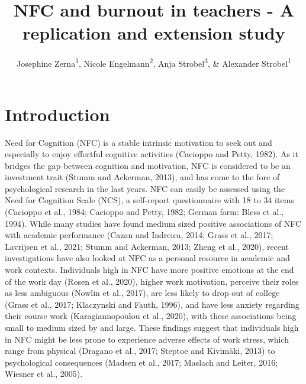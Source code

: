 \documentclass[
  english,
  man,floatsintext]{apa6}
\title{NFC and burnout in teachers - A replication and extension study}
\author{Josephine Zerna\textsuperscript{1}, Nicole Engelmann\textsuperscript{2}, Anja Strobel\textsuperscript{3}, \& Alexander Strobel\textsuperscript{1}}
\date{}
\affiliation{\vspace{0.5cm}\textsuperscript{1} Faculty of Psychology, Technische Universität Dresden\\\textsuperscript{2} Faculty of Education, Technische Universität Dresden\\\textsuperscript{3} Institute of Psychology, Chemnitz University of Technology}
\begin{document}
\maketitle

\renewcommand\thesection{\Alph{section}}
\setcounter{figure}{0}
\setcounter{table}{0}

\hypertarget{introduction}{%
\section{Introduction}\label{introduction}}

Need for Cognition (NFC) is a stable intrinsic motivation to seek out and especially to enjoy effortful cognitive activities (Cacioppo and Petty, 1982).
As it bridges the gap between cognition and motivation, NFC is considered to be an investment trait (Stumm and Ackerman, 2013), and has come to the fore of psychological research in the last years.
NFC can easily be assessed using the Need for Cognition Scale (NCS), a self-report questionnaire with 18 to 34 items (Cacioppo et al., 1984; Cacioppo and Petty, 1982; German form: Bless et al., 1994).
While many studies have found medium sized positive associations of NFC with academic performance (Cazan and Indreica, 2014; Grass et al., 2017; Lavrijsen et al., 2021; Stumm and Ackerman, 2013; Zheng et al., 2020), recent investigations have also looked at NFC as a personal resource in academic and work contexts.
Individuals high in NFC have more positive emotions at the end of the work day (Rosen et al., 2020), higher work motivation, perceive their roles as less ambiguous (Nowlin et al., 2017), are less likely to drop out of college (Grass et al., 2017; Klaczynski and Fauth, 1996), and have less anxiety regarding their course work (Karagiannopoulou et al., 2020), with these associations being small to medium sized by and large.
These findings suggest that individuals high in NFC might be less prone to experience adverse effects of work stress, which range from physical (Dragano et al., 2017; Steptoe and Kivimäki, 2013) to psychological consequences (Madsen et al., 2017; Maslach and Leiter, 2016; Wiesner et al., 2005).
\end{document}
